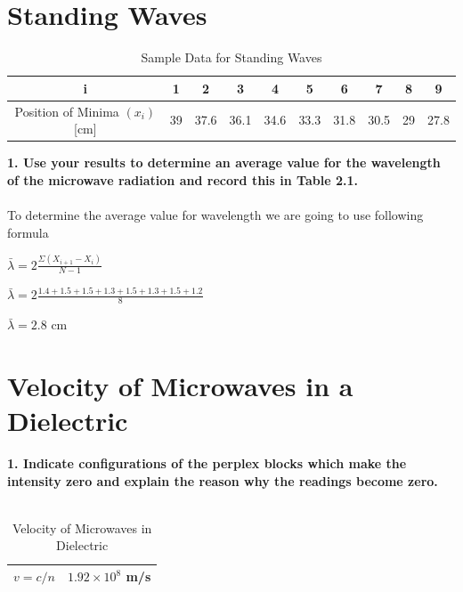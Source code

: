 \documentclass[a4paper,12pt]{report}
\begin{document}
\section{Standing Waves}
\begin{table}[h]
	\begin{center}
\begin{tabular}{|c|c|c|c|c|c|c|c|c|c|}
	\hline i & 1 & 2 & 3 & 4 & 5 & 6 & 7 & 8 & 9 \\ 
	\hline Position of Minima $(x_{i})$ [cm] & 39 & 37.6 & 36.1 & 34.6 & 33.3 & 31.8 & 30.5 & 29 & 27.8 \\ 
	\hline 
	\end{tabular} 
\end{center}
\caption{Sample Data for Standing Waves}
\end{table}
\textbf{1. Use your results to determine an average value for the wavelength of the microwave radiation and record this in Table 2.1.}\\\\
To determine the average value for wavelength we are going to use following formula
\begin{center}
	{\large $\bar{\lambda}=2\frac{\Sigma(X_{i+1}-X_{i})}{N-1}$}
\end{center}
\begin{center}
{\large 	$\bar{\lambda}=2\frac{1.4+1.5+1.5+1.3+1.5+1.3+1.5+1.2}{8}$}
\end{center}
	\begin{center}
		$\bar{\lambda}=2.8$ cm
	\end{center}
\section{Velocity of Microwaves in a Dielectric}
\textbf{1. Indicate configurations of the perplex blocks which make the intensity zero and explain the reason why the readings become zero.}\\\\
\begin{table}[h]
	\begin{center}
\begin{tabular}{|c|c|}
	\hline $v=c/n$ & $1.92\times10^{8}$ m/s \\ 
	\hline 
\end{tabular} 
\end{center}
\caption{Velocity of Microwaves in Dielectric}
\end{table}
\end{document}
